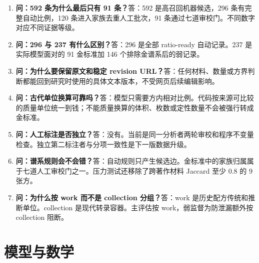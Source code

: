 \documentclass[UTF8,11pt,openany,fontset=none]{ctexbook}
\begin{document}
\begin{enumerate}[resume]
\item \textbf{问：592 条为什么最后只有 91 条？}\quad 答：592 是高召回机器候选，296 条有完整自动比例，120 条进入家族去重人工批次，91 条通过七道审校门。不同数字对应不同证据等级。
\item \textbf{问：296 与 237 有什么区别？}\quad 答：296 是全部 ratio-ready 自动记录。237 是实际模型面对的 91 金标准加 146 个排除金谱系后的弱记录。
\item \textbf{问：为什么要保留原文和稳定 revision URL？}\quad 答：任何材料、数量或方界判断都能回到研究时使用的具体文本版本，不受网页后续编辑影响。
\item \textbf{问：古代单位换算可靠吗？}\quad 答：模型只需要方内相对比例。代码按来源可比较的质量单位统一到钱；不能质量换算的体积、枚数或定性数量不会被强行转成金标准。
\item \textbf{问：人工标注是否独立？}\quad 答：没有。当前是同一分析者两轮审校和程序不变量检查。独立第二标注者与分项一致性是下一版数据升级。
\item \textbf{问：谱系规则会不会错？}\quad 答：自动规则只产生候选边。金标准中的家族归属属于七道人工审校门之一。压力测试还移除了跨著作材料 Jaccard 至少 0.8 的 9 张方。
\item \textbf{问：为什么按 work 而不是 collection 分组？}\quad 答：work 是历史配方传统和推断单位。collection 是现代转录容器。主评估按 work，弱监督为防泄漏额外按 collection 阻断。
\end{enumerate}

\section{模型与数学}
\end{document}
